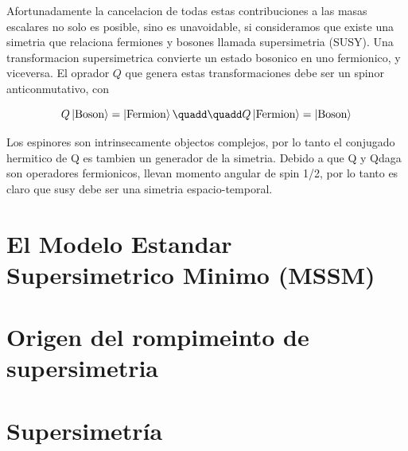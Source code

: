 
Afortunadamente la cancelacion de todas estas contribuciones a las masas escalares no solo es posible,
sino es unavoidable, si consideramos que existe una simetria que relaciona fermiones y bosones llamada
supersimetria (SUSY).
Una transformacion supersimetrica convierte un estado bosonico en uno fermionico, y viceversa.
El oprador $Q$ que genera estas transformaciones debe ser un spinor anticonmutativo, con

\begin{equation}
  Q \ket{\text{Boson}} = \ket{\text{Fermion}} \quadd \quadd Q \ket{\text{Fermion}} = \ket{\text{Boson}}
\end{equation}

Los espinores son intrinsecamente objectos complejos, por lo tanto el conjugado hermitico de Q es tambien
un generador de la simetria. Debido a que Q y Qdaga son operadores fermionicos, llevan momento angular de spin
1/2, por lo tanto es claro que susy debe ser una simetria espacio-temporal.



\section{El Modelo Estandar Supersimetrico Minimo (MSSM)} %

\section{Origen del rompimeinto de supersimetria}








\section{Supersimetr\'ia}

